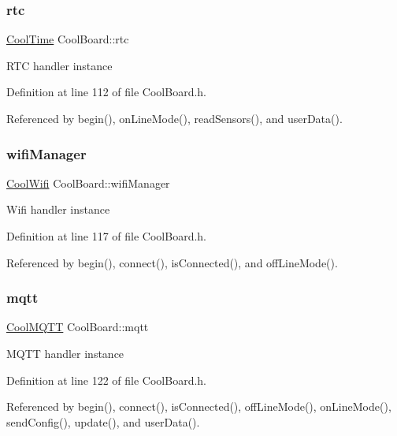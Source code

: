 \subsubsection{\texorpdfstring{rtc}{rtc}}
{\footnotesize\ttfamily \hyperlink{class_cool_time}{Cool\+Time} Cool\+Board\+::rtc\hspace{0.3cm}{\ttfamily [private]}}

R\+TC handler instance 

Definition at line 112 of file Cool\+Board.\+h.



Referenced by begin(), on\+Line\+Mode(), read\+Sensors(), and user\+Data().

\mbox{\label{class_cool_board_acd88e6003606b47479ebba81e4aceeca}} 
\subsubsection{\texorpdfstring{wifi\+Manager}{wifiManager}}
{\footnotesize\ttfamily \hyperlink{class_cool_wifi}{Cool\+Wifi} Cool\+Board\+::wifi\+Manager\hspace{0.3cm}{\ttfamily [private]}}

Wifi handler instance 

Definition at line 117 of file Cool\+Board.\+h.



Referenced by begin(), connect(), is\+Connected(), and off\+Line\+Mode().

\mbox{\label{class_cool_board_a2399f44d7c23c1149a335cb3b46d90f1}} 
\subsubsection{\texorpdfstring{mqtt}{mqtt}}
{\footnotesize\ttfamily \hyperlink{class_cool_m_q_t_t}{Cool\+M\+Q\+TT} Cool\+Board\+::mqtt\hspace{0.3cm}{\ttfamily [private]}}

M\+Q\+TT handler instance 

Definition at line 122 of file Cool\+Board.\+h.



Referenced by begin(), connect(), is\+Connected(), off\+Line\+Mode(), on\+Line\+Mode(), send\+Config(), update(), and user\+Data().


